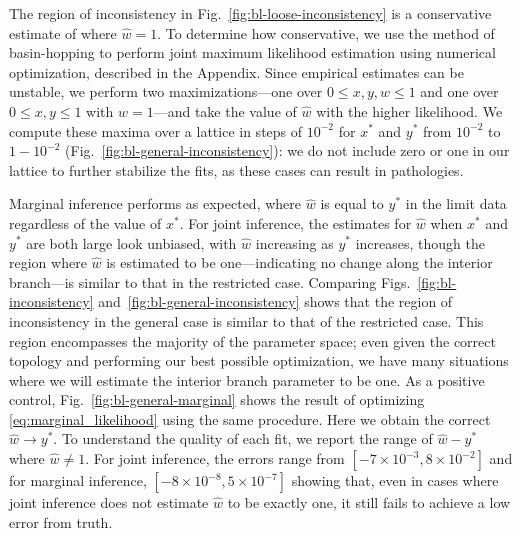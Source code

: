 \documentclass{article}
\begin{document}
The region of inconsistency in Fig.~\ref{fig:bl-loose-inconsistency} is a conservative estimate of where $\hat{w}=1$.
To determine how conservative, we use the method of basin-hopping \cite{Wales1997} to perform joint maximum likelihood estimation using numerical optimization, described in the Appendix.
Since empirical estimates can be unstable, we perform two maximizations---one over $0 \le x,y,w \le 1$ and one over $0 \le x,y \le 1$ with $w=1$---and take the value of $\hat{w}$ with the higher likelihood.
We compute these maxima over a lattice in steps of $10^{-2}$ for $x^*$ and $y^*$ from $10^{-2}$ to $1-10^{-2}$ (Fig.~\ref{fig:bl-general-inconsistency}): we do not include zero or one in our lattice to further stabilize the fits, as these cases can result in pathologies.

Marginal inference performs as expected, where $\hat{w}$ is equal to $y^*$ in the limit data regardless of the value of $x^*$.
For joint inference, the estimates for $\hat{w}$ when $x^*$ and $y^*$ are both large look unbiased, with $\hat{w}$ increasing as $y^*$ increases, though the region where $\hat{w}$ is estimated to be one---indicating no change along the interior branch---is similar to that in the restricted case.
Comparing Figs.~\ref{fig:bl-inconsistency} and~\ref{fig:bl-general-inconsistency} shows that the region of inconsistency in the general case is similar to that of the restricted case.
This region encompasses the majority of the parameter space; even given the correct topology and performing our best possible optimization, we have many situations where we will estimate the interior branch parameter to be one.
As a positive control, Fig.~\ref{fig:bl-general-marginal} shows the result of optimizing \eqref{eq:marginal_likelihood} using the same procedure.
Here we obtain the correct $\hat{w}\rightarrow y^*$.
To understand the quality of each fit, we report the range of $\hat{w}-y^*$ where $\hat{w}\neq 1$.
For joint inference, the errors range from $[-7\times 10^{-3}, 8\times 10^{-2}]$ and for marginal inference, $[-8\times 10^{-8}, 5\times 10^{-7}]$ showing that, even in cases where joint inference does not estimate $\hat{w}$ to be exactly one, it still fails to achieve a low error from truth.
\end{document}

